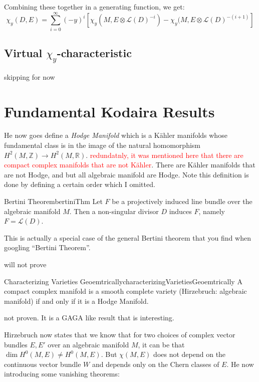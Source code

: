 \documentclass{book}
\newcommand{\R}{{\mathbb{R}}}
\newcommand{\Z}{{\mathbb{Z}}}
\newcommand{\CL}{{\mathcal{L}}}
\begin{document}
Combining these together in a generating function, we get:
\[
  \chi_y(D, E) = \sum_{i=0}^\infty (-y)^i [\chi_y(M, E\otimes \CL(D)^{-i}) - \chi_y (M, E\otimes
  \CL(D)^{-(i+1)}]
\]


\subsection{Virtual $\chi_y$-characteristic}\label{sec:virtualEulerChar}

skipping for now

\section{Fundamental Kodaira Results}\label{sec:Kodaira}

\cite[p.138]{hirzebruchTopologicalMethodsAlgebraic1995}

He now goes define a \emph{Hodge Manifold} which is a K\"ahler manifolds whose fundamental class is in the
image of the natural homomorphism $H^2(M, \Z) \to H^2(M, \R)$. \textcolor{red}{redundatnly, it was mentioned
here that there are compact complex manifolds that are not K\"ahler}. There are K\"ahler manifolds that are not
Hodge, and but all algebraic manifold are Hodge. Note this definition is done by defining a certain order which
I omitted.

\begin{thm}{Bertini Theorem}{bertiniThm}
  Let $F$ be a projectively induced line bundle over the algebraic manifold $M$. Then a non-singular divisor
  $D$ induces $F$, namely $F = \CL(D)$.
\end{thm}

This is actually a special case of the general Bertini theorem that you find when googling ``Bertini
Theorem''.

\begin{Proof}
  will not prove
\end{Proof}

\begin{thm}{Characterizing Varieties Geoemtrically}{characterizingVarietiesGeoemtrically}
  A compact complex manifold is a smooth complete variety (Hirzebruch: algebraic manifold) if and only if it is a Hodge Manifold.
\end{thm}

\begin{Proof}
  not proven. It is a GAGA like result that is interesting.
\end{Proof}

Hirzebruch now states that we know that for two choices of complex vector bundles $E, E'$ over an algebraic
manifold $M$, it can be that $\dim H^0(M, E) \ne H^0(M, E)$. But $\chi(M, E)$ does not depend on the
continuous vector bundle $W$ and depends only on the Chern classes of $E$. He now introducing some vanishing
theorems:
\end{document}
